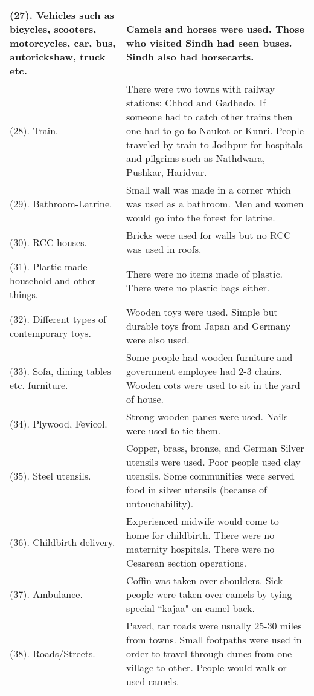 \begin{center}
\begin{longtable}{p{5cm}|p{10cm}}
\hline
(27). Vehicles such as bicycles, scooters, motorcycles, car, bus, autorickshaw, truck etc. &
Camels and horses were used. Those who visited Sindh had seen buses. Sindh also had horsecarts. \\
\hline
(28). Train. &
There were two towns with railway stations: Chhod and Gadhado. If someone had to catch other trains then one had to go to Naukot or Kunri. People traveled by train to Jodhpur for hospitals and pilgrims such as Nathdwara, Pushkar, Haridvar.\\
\hline
(29). Bathroom-Latrine. &
Small wall was made in a corner which was used as a bathroom. Men and women would go into the forest for latrine.\\
\hline
(30). RCC houses. &
Bricks were used for walls but no RCC was used in roofs.\\
\hline
(31). Plastic made household and other things. &
There were no items made of plastic. There were no plastic bags either. \\
\hline
(32). Different types of contemporary toys. &
Wooden toys were used. Simple but durable toys from Japan and Germany were also used. \\
\hline
(33). Sofa, dining tables etc. furniture. &
Some people had wooden furniture and government employee had 2-3 chairs. Wooden cots were used to sit in the yard of house.\\
\hline
(34). Plywood, Fevicol. & 
Strong wooden panes were used. Nails were used to tie them. \\
\hline
(35). Steel utensils. &
Copper, brass, bronze, and German Silver utensils were used. Poor people used clay utensils. Some communities were served food in silver utensils (because of untouchability).\\
\hline
(36). Childbirth-delivery. &
Experienced midwife would come to home for childbirth. There were no maternity hospitals. There were no Cesarean section operations.\\
\hline
(37). Ambulance. &
Coffin was taken over shoulders. Sick people were taken over camels by tying special ``kajaa" on camel back.\\
\hline
(38). Roads/Streets. &
Paved, tar roads were usually 25-30 miles from towns. Small footpaths were used in order to travel through dunes from one village to other. People would walk or used camels.\\
\hline
\end{longtable}
\end{center}

